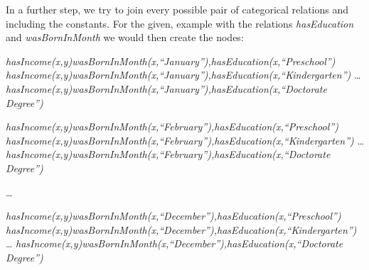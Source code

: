 In a further step, we try to join every possible pair of categorical relations and including the constants. For the
given, example with the relations \emph{hasEducation} and \emph{wasBornInMonth} we would then create the nodes:

  \emph{hasIncome(x,y)wasBornInMonth(x,``January''),hasEducation(x,``Preschool'')} \newline
  \emph{hasIncome(x,y)wasBornInMonth(x,``January''),hasEducation(x,``Kindergarten'')} \newline
  \dots \newline
  \emph{hasIncome(x,y)wasBornInMonth(x,``January''),hasEducation(x,``Doctorate Degree'')} \newline

  \emph{hasIncome(x,y)wasBornInMonth(x,``February''),hasEducation(x,``Preschool'')} \newline
  \emph{hasIncome(x,y)wasBornInMonth(x,``February''),hasEducation(x,``Kindergarten'')} \newline
  \dots \newline
  \emph{hasIncome(x,y)wasBornInMonth(x,``February''),hasEducation(x,``Doctorate Degree'')} \newline
 
  \dots \newline

  \emph{hasIncome(x,y)wasBornInMonth(x,``December''),hasEducation(x,``Preschool'')} \newline
  \emph{hasIncome(x,y)wasBornInMonth(x,``December''),hasEducation(x,``Kindergarten'')} \newline
  \dots \newline
  \emph{hasIncome(x,y)wasBornInMonth(x,``December''),hasEducation(x,``Doctorate Degree'')} \newline
  

  
 
